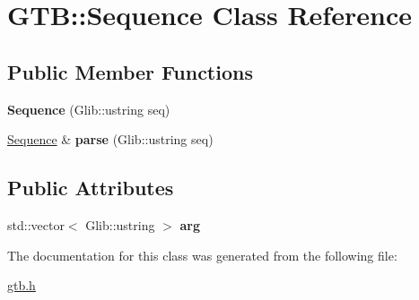 \hypertarget{a00020}{}\section{G\+TB\+:\+:Sequence Class Reference}
\label{a00020}
\subsection*{Public Member Functions}
\begin{DoxyCompactItemize}
\item 
\mbox{\label{a00020_a769614336b544f4e246242451e5e2f00}} 
{\bfseries Sequence} (Glib\+::ustring seq)
\item 
\mbox{\label{a00020_a947676e33944fbeca40f449d349a276c}} 
\hyperlink{a00020}{Sequence} \& {\bfseries parse} (Glib\+::ustring seq)
\end{DoxyCompactItemize}
\subsection*{Public Attributes}
\begin{DoxyCompactItemize}
\item 
\mbox{\label{a00020_a683fe7c1b226884d25cd3f5641622a8b}} 
std\+::vector$<$ Glib\+::ustring $>$ {\bfseries arg}
\end{DoxyCompactItemize}


The documentation for this class was generated from the following file\+:\begin{DoxyCompactItemize}
\item 
\hyperlink{a00005}{gtb.\+h}\end{DoxyCompactItemize}

